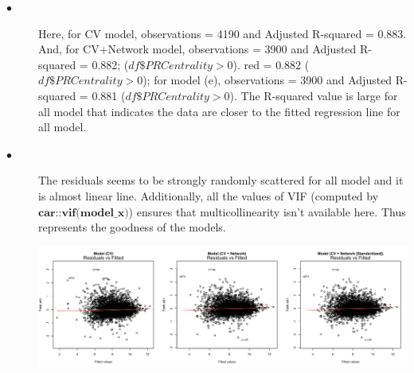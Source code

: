 \documentclass{article}\usepackage[]{graphicx}\usepackage[]{color}
\begin{document}
\begin{description}
  \item[$\bullet$] Here, for CV model, observations = 4190 and Adjusted R-squared = 0.883. And, for CV+Network model, observations = 3900 and Adjusted R-squared = 0.882; ($df\$PRCentrality > 0$). red = 0.882 ($df\$PRCentrality > 0$); for model (e), observations = 3900 and Adjusted R-squared = 0.881 ($df\$PRCentrality > 0$). The R-squared value is large for all model that indicates the data are closer to the fitted regression line for all model. 
  \item[$\bullet$] The residuals seems to be strongly randomly scattered for all model and it is almost linear line. Additionally, all the values of VIF (computed by $\textbf{car::vif(model\_x)}$) ensures that multicollinearity isn’t available here. Thus represents the goodness of the models. 
    \begin{center}
    \includegraphics[scale=0.33]{ResidualPlots_TableS2.png}
    \end{center}
\end{description}

\newpage
\end{document}
